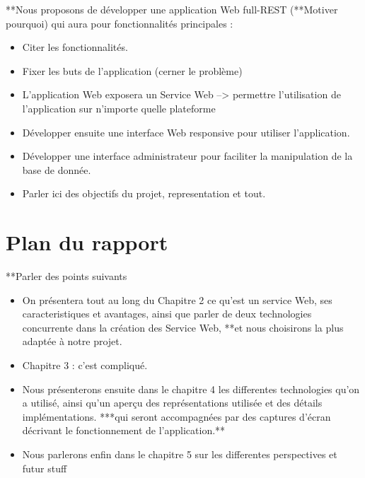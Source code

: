		
**Nous proposons de développer une application Web full-REST (**Motiver pourquoi) qui aura pour fonctionnalités principales : 
\begin{itemize}
	\item Citer les fonctionnalités.
	\item Fixer les buts de l'application (cerner le problème)
	\item L'application Web exposera un Service Web --> permettre l'utilisation de l'application sur n'importe quelle plateforme 
	\item Développer ensuite une interface Web responsive pour utiliser l'application.
	\item Développer une interface administrateur pour faciliter la manipulation de la  base de donnée.
	\item Parler ici des objectifs du projet, representation et tout.
\end{itemize}
		 
		 
\newpage
\section{Plan du rapport}

**Parler des points suivants 
\begin{itemize}
\item On présentera tout au long du Chapitre 2 ce qu'est un service Web, ses caracteristiques et avantages, ainsi que parler de deux technologies concurrente dans la création des Service Web, **et nous choisirons la plus adaptée à notre projet.
\item Chapitre 3 : c'est compliqué.
\item Nous présenterons ensuite dans le chapitre 4 les differentes technologies qu'on a utilisé, ainsi qu'un aperçu des représentations utilisée et des détails implémentations. ***qui seront accompagnées par des captures d'écran décrivant le fonctionnement de l'application.**
\item Nous parlerons enfin dans le chapitre 5 sur les differentes perspectives et futur stuff
\end{itemize}